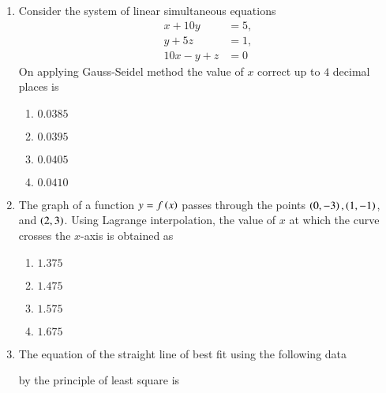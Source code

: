 \documentclass[journal]{IEEEtran}
\begin{document}
\begin{enumerate}
{If the two eigen values of the matrix $M=\myvec{2&6&0\\1&p&0\\0&0&3}$ are $-1$ and $4$, then the value of $p$ is 
\begin{multicols}{4}
\begin{enumerate}
\item $4$
\item $2$
\item $1$
\item $-1$
\end{enumerate}
\end{multicols}
}
\item{
Consider the system of linear simultaneous equations
\begin{align*}
x+10y &= 5, \\
y+5z &= 1, \\
10x-y+z &= 0
\end{align*}
On applying Gauss-Seidel method the value of $x$ correct up to $4$ decimal places is
\begin{multicols}{4}
\begin{enumerate}
\item $0.0385$
\item $0.0395$
\item $0.0405$
\item $0.0410$
\end{enumerate}
\end{multicols}
}
\item{
The graph of a function $y=f\left(x\right)$ passes through the points $\left(0,-3\right),\left(1,-1\right)$, and $\left(2,3\right)$. Using Lagrange interpolation, the value of $x$ at which the curve crosses the $x$-axis is obtained as
\begin{multicols}{4}
\begin{enumerate}
\item $1.375$
\item $1.475$
\item $1.575$
\item $1.675$
\end{enumerate}
\end{multicols}
}
\item{
The equation of the straight line of best fit using the following data 
\begin{table}[h!]   
  \centering
  
\end{table}
by the principle of least square is
\begin{multicols}{4}
\begin{enumerate}

\end{enumerate}
\end{multicols}}
\end{enumerate}
\end{document}
